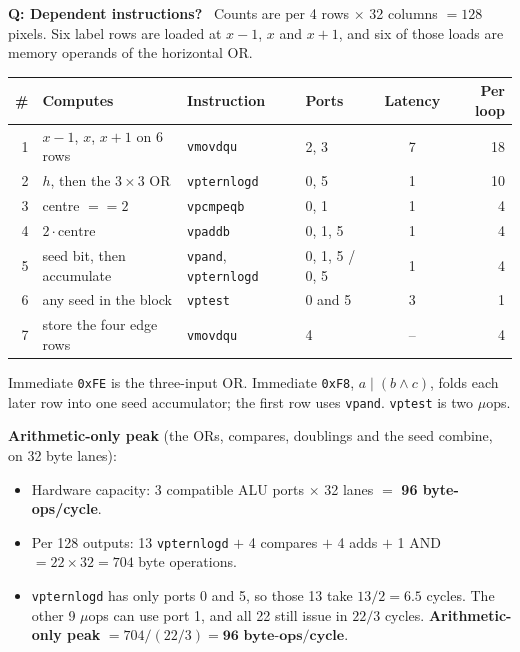\documentclass[10pt]{article}
\newcommand{\Q}[1]{\textbf{Q: #1}\ }
\begin{document}
\Q{Dependent instructions?} Counts are per 4 rows $\times$ 32 columns $=128$ pixels. Six label rows are loaded at $x-1$, $x$ and $x+1$, and six of those loads are memory operands of the horizontal OR.
\begin{center}\small
\begin{tabular}{rlllcr}
\toprule
\# & Computes & Instruction & Ports & Latency & Per loop \\
\midrule
1 & $x-1$, $x$, $x+1$ on 6 rows & \texttt{vmovdqu} & 2, 3 & 7 & 18 \\
2 & $h$, then the $3\times 3$ OR & \texttt{vpternlogd} & 0, 5 & 1 & 10 \\
3 & centre $== 2$ & \texttt{vpcmpeqb} & 0, 1 & 1 & 4 \\
4 & $2\cdot\mathrm{centre}$ & \texttt{vpaddb} & 0, 1, 5 & 1 & 4 \\
5 & seed bit, then accumulate & \texttt{vpand}, \texttt{vpternlogd} & 0, 1, 5 / 0, 5 & 1 & 4 \\
6 & any seed in the block & \texttt{vptest} & 0 and 5 & 3 & 1 \\
7 & store the four edge rows & \texttt{vmovdqu} & 4 & -- & 4 \\
\bottomrule
\end{tabular}
\end{center}
Immediate \texttt{0xFE} is the three-input OR. Immediate \texttt{0xF8}, $a\mid(b\wedge c)$, folds each later row into one seed accumulator; the first row uses \texttt{vpand}. \texttt{vptest} is two $\mu$ops.

\textbf{Arithmetic-only peak} (the ORs, compares, doublings and the seed combine, on 32 byte lanes):
\begin{itemize}
\item Hardware capacity: 3 compatible ALU ports $\times$ 32 lanes $=$ \textbf{96 byte-ops/cycle}.
\item Per 128 outputs: 13 \texttt{vpternlogd} $+$ 4 compares $+$ 4 adds $+$ 1 AND $=22\times 32=704$ byte operations.
\item \texttt{vpternlogd} has only ports 0 and 5, so those 13 take $13/2=6.5$ cycles. The other 9 $\mu$ops can use port 1, and all 22 still issue in $22/3$ cycles. \textbf{Arithmetic-only peak} $=704/(22/3)=\textbf{96 byte-ops/cycle}$.
\end{itemize}
\end{document}
